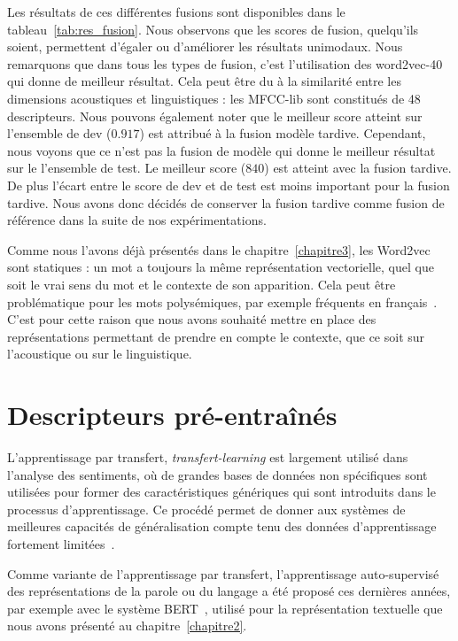 
Les résultats de ces différentes fusions sont disponibles dans le tableau~\ref{tab:res_fusion}. Nous observons que les scores de fusion, quelqu'ils soient, permettent d'égaler ou d'améliorer les résultats unimodaux. Nous remarquons que dans tous les types de fusion, c'est l'utilisation des word2vec-40 qui donne de meilleur résultat. Cela peut être du à la similarité entre les dimensions acoustiques et linguistiques : les MFCC-lib sont constitués de 48 descripteurs.
Nous pouvons également noter que le meilleur score atteint sur l'ensemble de dev ($0.917$) est attribué à la fusion modèle tardive. Cependant, nous voyons que ce n'est pas la fusion de modèle qui donne le meilleur résultat sur le l'ensemble de test. Le meilleur score ($840$) est atteint avec la fusion tardive. De plus l'écart entre le score de dev et de test est moins important pour la fusion tardive. Nous avons donc décidés de conserver la fusion tardive comme fusion de référence dans la suite de nos expérimentations.

Comme nous l'avons déjà présentés dans le chapitre~\ref{chapitre3}, les Word2vec sont statiques : un mot a toujours la même représentation vectorielle, quel que soit le vrai sens du mot et le contexte de son apparition. Cela peut être problématique pour les mots polysémiques, par exemple fréquents en français~\cite{Pustejovsky1996}. C'est pour cette raison que nous avons souhaité mettre en place des représentations permettant de prendre en compte le contexte, que ce soit sur l'acoustique ou sur le linguistique.

\section{Descripteurs pré-entraînés}

L'apprentissage par transfert, \textit{transfert-learning} est largement utilisé dans l'analyse des sentiments, où de grandes bases de données non spécifiques sont utilisées pour former des caractéristiques génériques qui sont introduits dans le processus d’apprentissage.
Ce procédé permet de donner aux systèmes de meilleures capacités de généralisation compte tenu des données d'apprentissage fortement limitées~\cite{Dong2018}.

Comme variante de l'apprentissage par transfert, l'apprentissage auto-supervisé des représentations de la parole ou du langage a été proposé ces dernières années, par exemple avec le système BERT~\cite{Devlin2019}, utilisé pour la représentation textuelle que nous avons présenté au chapitre~\ref{chapitre2}.


